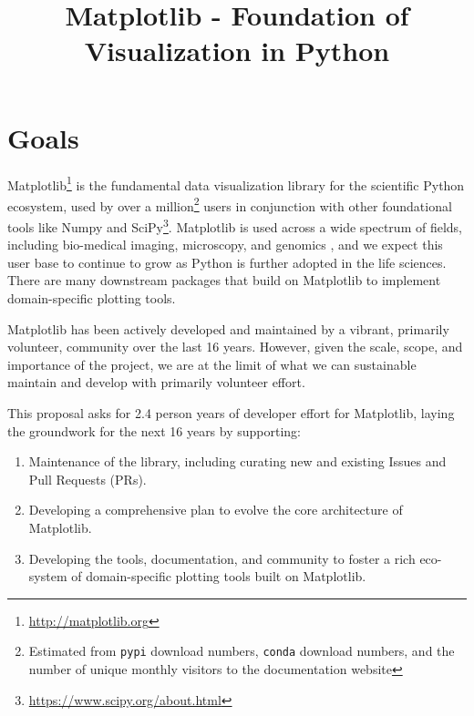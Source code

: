 \documentclass[11pt]{article}  %
\begin{document}
\title{Matplotlib - Foundation of Visualization in Python}
\author{}
\maketitle

\section{Goals}

Matplotlib\footnote{\url{http://matplotlib.org}} is the fundamental
data visualization library for the scientific Python ecosystem, used
by over a million\footnote{Estimated from \texttt{pypi} download
numbers, \texttt{conda} download numbers, and the number of unique
monthly visitors to the documentation website} users in conjunction
with other foundational tools like Numpy and
SciPy\footnote{\url{https://www.scipy.org/about.html}}.  Matplotlib is
used across a wide spectrum of fields, including bio-medical imaging,
microscopy, and genomics
\cite{Carpenter2006,Wolf2018,10.7717/peerj.453,
  Segata2011,10.1371/journal.pgen.1000695,HASHIMSHONY2012666,
  10.1093/bioinformatics/bts480,Carlile2014,Laganowsky2014,Jiangaac9462,
  10.3389/fninf.2014.00014}, and we expect this user base to continue
to grow as Python is further adopted in the life sciences.
There are
many downstream packages that build on Matplotlib to implement
domain-specific plotting tools.

Matplotlib has been actively developed and maintained by a vibrant,
primarily volunteer, community over the last 16 years.  However, given
the scale, scope, and importance of the project, we are at the limit
of what we can sustainable maintain and develop with primarily
volunteer effort.

This proposal asks for 2.4 person years of developer effort for
Matplotlib, laying the groundwork for the next 16 years by supporting:

\begin{enumerate}[label=\alph*),noitemsep]
  \item Maintenance of the library, including curating new and
    existing Issues and Pull Requests (PRs).
  \item Developing a comprehensive plan to evolve the core architecture
    of Matplotlib.
  \item Developing the tools, documentation, and community to foster a
    rich eco-system of domain-specific plotting tools built on
    Matplotlib.
\end{enumerate}
\end{document}

